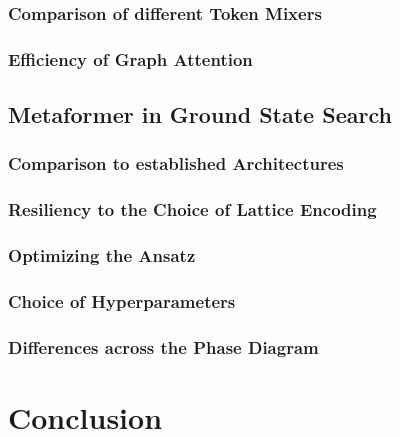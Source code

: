 \documentclass[
headings=optiontohead,              %
12pt,                               %
DIV=13,                             %
twoside=false,                      %
open=right,                         %
BCOR=10mm,                          %
toc=bibliographynumbered            %
]{scrreport}
\begin{document}
        \subsection{Comparison of different Token Mixers}
        \label{sec:experiments-tokenmixers}
        
        \FloatBarrier
        \subsection{Efficiency of Graph Attention}
        \label{sec:experiments-efficiency-graphs}
        
        \FloatBarrier

    \section{Metaformer in Ground State Search}
    \label{sec:experiments-ground-state-search}
    
        \subsection{Comparison to established Architectures}
        \label{sec:experiments-comparisontoestablished}
        
        \FloatBarrier
        \subsection{Resiliency to the Choice of Lattice Encoding}
        \label{sec:experiments-resiliencylatticeencoding}
        
        \FloatBarrier
        \subsection{Optimizing the Ansatz}
        \label{sec:experiments-optimizingtheansatz}
        
        \FloatBarrier
        \subsection{Choice of Hyperparameters}
        \label{sec:experiments-hyperparameters}
        
        \FloatBarrier
        \subsection{Differences across the Phase Diagram}
        \label{sec:experiments-phasecriticalpoint}
        
        \FloatBarrier

\chapter{Conclusion}
\label{sec:conclusion}

\FloatBarrier



\end{document}
